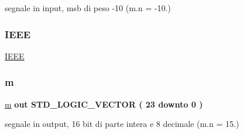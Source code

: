 segnale in input, msb di peso -\/10 (m.\+n = -\/10.) 

\mbox{\label{group___linear_regression_gae4f03c286607f3181e16b9aa12d0c6d4}} 
\subsubsection{\texorpdfstring{I\+E\+EE}{IEEE}}
{\footnotesize\ttfamily \hyperlink{group___linear_regression_gae4f03c286607f3181e16b9aa12d0c6d4}{I\+E\+EE}\hspace{0.3cm}{\ttfamily [Library]}}

\mbox{\label{group___linear_regression_gad943f01112876248a4734aa3c3d2e3f2}} 
\subsubsection{\texorpdfstring{m}{m}}
{\footnotesize\ttfamily \hyperlink{group___linear_regression_gad943f01112876248a4734aa3c3d2e3f2}{m} {\bfseries \textcolor{vhdlchar}{out}\textcolor{vhdlchar}{ }} {\bfseries \textcolor{vhdlchar}{S\+T\+D\+\_\+\+L\+O\+G\+I\+C\+\_\+\+V\+E\+C\+T\+OR}\textcolor{vhdlchar}{ }\textcolor{vhdlchar}{(}\textcolor{vhdlchar}{ }\textcolor{vhdlchar}{ } \textcolor{vhdldigit}{23} \textcolor{vhdlchar}{ }\textcolor{vhdlchar}{downto}\textcolor{vhdlchar}{ }\textcolor{vhdlchar}{ } \textcolor{vhdldigit}{0} \textcolor{vhdlchar}{ }\textcolor{vhdlchar}{)}\textcolor{vhdlchar}{ }} \hspace{0.3cm}{\ttfamily [Port]}}



segnale in output, 16 bit di parte intera e 8 decimale (m.\+n = 15.) 

\mbox{\label{group___linear_regression_ga8e3ef6c468a1560f19de3430d956a75c}} 
